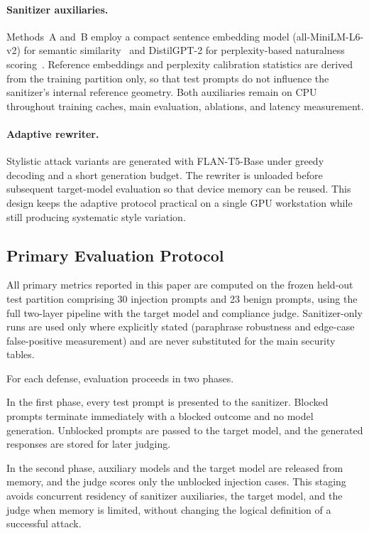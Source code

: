 \paragraph{Sanitizer auxiliaries.}
Methods~A and~B employ a compact sentence embedding model (all-MiniLM-L6-v2) for semantic similarity~\cite{reimers2019sentence,wang2020minilm} and DistilGPT-2 for perplexity-based naturalness scoring~\cite{radford2019language}.
Reference embeddings and perplexity calibration statistics are derived from the training partition only, so that test prompts do not influence the sanitizer's internal reference geometry.
Both auxiliaries remain on CPU throughout training caches, main evaluation, ablations, and latency measurement.

\paragraph{Adaptive rewriter.}
Stylistic attack variants are generated with FLAN-T5-Base under greedy decoding and a short generation budget.
The rewriter is unloaded before subsequent target-model evaluation so that device memory can be reused.
This design keeps the adaptive protocol practical on a single GPU workstation while still producing systematic style variation.

\subsection{Primary Evaluation Protocol}
\label{sec:eval-protocol}

All primary metrics reported in this paper are computed on the frozen held-out test partition comprising 30 injection prompts and 23 benign prompts, using the full two-layer pipeline with the target model and compliance judge.
Sanitizer-only runs are used only where explicitly stated (paraphrase robustness and edge-case false-positive measurement) and are never substituted for the main security tables.

For each defense, evaluation proceeds in two phases.

In the first phase, every test prompt is presented to the sanitizer.
Blocked prompts terminate immediately with a blocked outcome and no model generation.
Unblocked prompts are passed to the target model, and the generated responses are stored for later judging.

In the second phase, auxiliary models and the target model are released from memory, and the judge scores only the unblocked injection cases.
This staging avoids concurrent residency of sanitizer auxiliaries, the target model, and the judge when memory is limited, without changing the logical definition of a successful attack.

